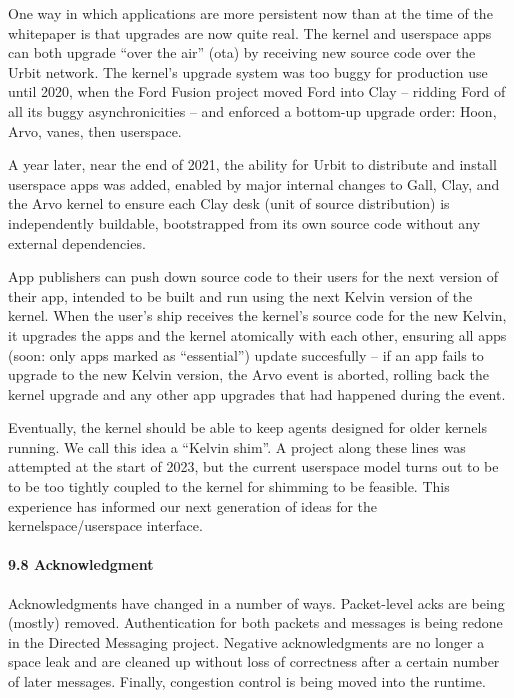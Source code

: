 \documentclass[twoside]{article}
\begin{document}
One way in which applications are more persistent now than at the time of the whitepaper is that upgrades are now quite real.  The kernel and userspace apps can both upgrade ``over the air'' ({\sc ota}) by receiving new source code over the Urbit network.  The kernel's upgrade system was too buggy for production use until 2020, when the Ford Fusion project moved Ford into Clay – ridding Ford of all its buggy asynchronicities – and enforced a bottom-up upgrade order: Hoon, Arvo, vanes, then userspace.

A year later, near the end of 2021, the ability for Urbit to distribute and install userspace apps was added, enabled by major internal changes to Gall, Clay, and the Arvo kernel to ensure each Clay desk (unit of source distribution) is independently buildable, bootstrapped from its own source code without any external dependencies.

App publishers can push down source code to their users for the next version of their app, intended to be built and run using the next Kelvin version of the kernel.  When the user's ship receives the kernel's source code for the new Kelvin, it upgrades the apps and the kernel atomically with each other, ensuring all apps (soon: only apps marked as ``essential'') update succesfully – if an app fails to upgrade to the new Kelvin version, the Arvo event is aborted, rolling back the kernel upgrade and any other app upgrades that had happened during the event.

Eventually, the kernel should be able to keep agents designed for older kernels running.  We call this idea a ``Kelvin shim''.  A project along these lines was attempted at the start of 2023, but the current userspace model turns out to be to be too tightly coupled to the kernel for shimming to be feasible.  This experience has informed our next generation of ideas for the kernelspace/userspace interface.

\paragraph{9.8 Acknowledgment}  Acknowledgments have changed in a number of ways.  Packet-level acks are being (mostly) removed.  Authentication for both packets and messages is being redone in the Directed Messaging project.  Negative acknowledgments are no longer a space leak and are cleaned up without loss of correctness after a certain number of later messages.  Finally, congestion control is being moved into the runtime.
\end{document}
